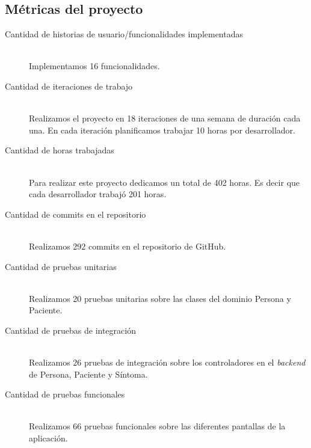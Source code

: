 \subsection{Métricas del proyecto}

\begin{description}
\item[Cantidad de historias de usuario/funcionalidades implementadas] \mbox{} \\
Implementamos 16 funcionalidades.

\item[Cantidad de iteraciones de trabajo] \mbox{} \\
Realizamos el proyecto en 18 iteraciones de una semana de duración cada una. En cada iteración planificamos trabajar 10 horas por desarrollador.

\item[Cantidad de horas trabajadas] \mbox{} \\
Para realizar este proyecto dedicamos un total de 402 horas. Es decir que cada desarrollador trabajó 201 horas.

\item[Cantidad de commits en el repositorio] \mbox{} \\
Realizamos 292 commits en el repositorio de GitHub.

\item[Cantidad de pruebas unitarias] \mbox{} \\
Realizamos 20 pruebas unitarias sobre las clases del dominio Persona y Paciente.

\item[Cantidad de pruebas de integración] \mbox{} \\
Realizamos 26 pruebas de integración sobre los controladores en el \textit{backend} de Persona, Paciente y Síntoma.

\item[Cantidad de pruebas funcionales] \mbox{} \\
Realizamos 66 pruebas funcionales sobre las diferentes pantallas de la aplicación.

\end{description}